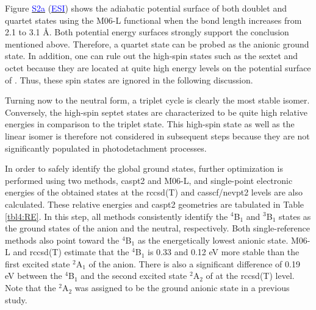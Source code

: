 \begin{refsection}
Figure \href{https://pubs.acs.org/doi/suppl/10.1021/acs.jpca.7b00245/suppl_file/jp7b00245_si_001.pdf}{\textcolor{blue}{S2a}} (\href{https://pubs.acs.org/doi/suppl/10.1021/acs.jpca.7b00245/suppl_file/jp7b00245_si_001.pdf}{\textcolor{blue}{ESI}}) shows the adiabatic potential surface of both doublet and quartet states using the M06-L functional when the 
 bond length increases from 2.1 to 3.1 \AA. Both potential energy surfaces strongly support the conclusion mentioned above. Therefore, a quartet state can be probed as the anionic ground state. In addition, one can rule out the high-spin states such as the sextet and octet because they are located at quite high energy levels on the potential surface of . Thus, these spin states are ignored in the following discussion. 



Turning now to the neutral form, a triplet cycle is clearly the most stable isomer. Conversely, the high-spin septet states are characterized to be quite high relative energies in comparison to the triplet state. This high-spin state as well as the linear isomer is therefore not considered in subsequent steps because they are not significantly populated in photodetachment processes. 




In order to safely identify the global ground states, further optimization is performed using two methods, \acrshort{caspt2} and M06-L, and single-point electronic energies of the obtained states at the \acrshort{rccsd}(T) and \acrshort{casscf}/\acrshort{nevpt2} levels are also calculated. These relative energies and \acrshort{caspt2} geometries are tabulated in Table \ref{tbl4:RE}. In this step, all methods consistently identify the $^4$B$_1$ and $^3$B$_1$ states as the ground states of the anion and the neutral, respectively. Both single-reference methods also point toward the $^4$B$_1$ as the energetically lowest anionic state. M06-L and \acrshort{rccsd}(T) estimate that the $^4$B$_1$ is 0.33 and 0.12 eV more  stable than the first excited state $^2$A$_1$ of the anion. There is also a significant difference of 0.19 eV between the $^4$B$_1$ and the second excited state $^2$A$_2$ of  at the \acrshort{rccsd}(T) level. Note that the $^2$A$_2$ was assigned to be the ground anionic state in a previous study.\cite{c4:22}





\end{refsection}

